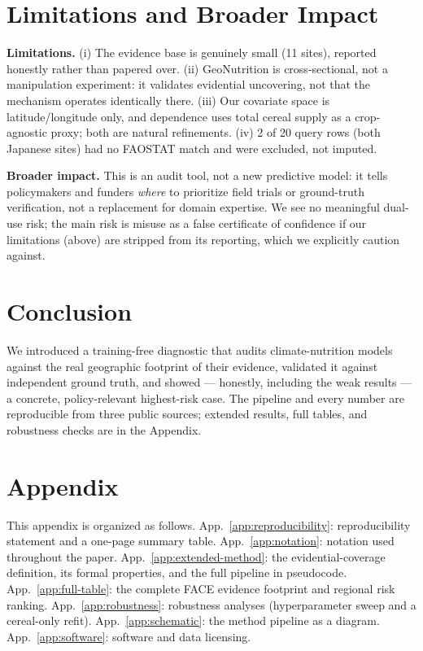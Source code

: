 \documentclass{article}
\begin{document}
\section{Limitations and Broader Impact}

\textbf{Limitations.} (i) The evidence base is genuinely small (11 sites), reported honestly rather than papered over. (ii) GeoNutrition is cross-sectional, not a manipulation experiment: it validates evidential uncovering, not that the mechanism operates identically there. (iii) Our covariate space is latitude/longitude only, and dependence uses total cereal supply as a crop-agnostic proxy; both are natural refinements. (iv) 2 of 20 query rows (both Japanese sites) had no FAOSTAT match and were excluded, not imputed.

\textbf{Broader impact.} This is an audit tool, not a new predictive model: it tells policymakers and funders \emph{where} to prioritize field trials or ground-truth verification, not a replacement for domain expertise. We see no meaningful dual-use risk; the main risk is misuse as a false certificate of confidence if our limitations (above) are stripped from its reporting, which we explicitly caution against.

\section{Conclusion}
We introduced a training-free diagnostic that audits climate-nutrition models against the real geographic footprint of their evidence, validated it against independent ground truth, and showed --- honestly, including the weak results --- a concrete, policy-relevant highest-risk case. The pipeline and every number are reproducible from three public sources; extended results, full tables, and robustness checks are in the Appendix.




\newpage
\appendix
\section*{Appendix}
This appendix is organized as follows. App.~\ref{app:reproducibility}: reproducibility statement and a one-page summary table. App.~\ref{app:notation}: notation used throughout the paper. App.~\ref{app:extended-method}: the evidential-coverage definition, its formal properties, and the full pipeline in pseudocode. App.~\ref{app:full-table}: the complete FACE evidence footprint and regional risk ranking. App.~\ref{app:robustness}: robustness analyses (hyperparameter sweep and a cereal-only refit). App.~\ref{app:schematic}: the method pipeline as a diagram. App.~\ref{app:software}: software and data licensing.
\end{document}
